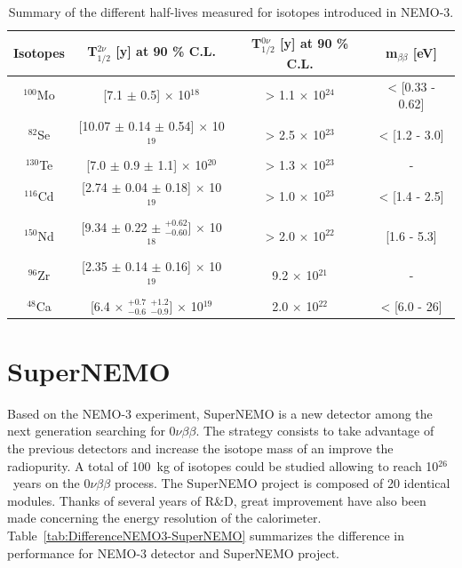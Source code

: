 \documentclass[main.tex]{subfiles}
\begin{document}
\begin{table}[h!]
\centering
\begin{tabular}{c|c|c|c}
Isotopes & T$_{\text{1/2}}^{\text{2}\nu}$ [y] at 90 \% C.L. & T$_{\text{1/2}}^{\text{0}\nu}$ [y] at 90 \% C.L. & m$_{\beta\beta}$ [eV] \\
\toprule
$^{\text{100}}$Mo \cite{NEMO3:Mo100} & [7.1 $\pm$ 0.5] $\times$ 10$^{\text{18}}$ & > 1.1 $\times$ 10$^{\text{24}}$ & < [0.33 - 0.62]  \\[0.1cm]
$^{\text{82}}$Se \cite{NEMO3:Se82} & [10.07 $\pm$ 0.14 $\pm$ 0.54] $\times$ 10$^{\text{19}}$ & > 2.5 $\times$ 10$^{\text{23}}$  & < [1.2 - 3.0]  \\[0.1cm]
$^{\text{130}}$Te \cite{NEMO3:Te130}& [7.0 $\pm$ 0.9 $\pm$ 1.1] $\times$ 10$^{\text{20}}$ & > 1.3 $\times$ 10$^{\text{23}}$  & - \\[0.1cm]
$^{\text{116}}$Cd \cite{Arnold2016bed}& [2.74 $\pm$ 0.04 $\pm$ 0.18] $\times$ 10$^{\text{19}}$ & > 1.0 $\times$ 10$^{\text{23}}$  & < [1.4 - 2.5]  \\[0.1cm]
$^{\text{150}}$Nd \cite{NEMO3:Nd150}& [9.34 $\pm$ 0.22 $\pm$ $^{+\text{0.62}}_{-\text{0.60}}$] $\times$ 10$^{\text{18}}$ & > 2.0 $\times$ 10$^{\text{22}}$  & [1.6 - 5.3] \\[0.1cm]
$^{\text{96}}$Zr  \cite{NEMO3:Zr96}& [2.35 $\pm$ 0.14 $\pm$ 0.16] $\times$ 10$^{\text{19}}$ & 9.2 $\times$ 10$^{\text{21}}$  & - \\[0.1cm]
$^{\text{48}}$Ca \cite{NEMO3:Ca48} & [6.4 $\times$ $^{+\text{0.7}}_{-\text{0.6}}$ $^{+\text{1.2}}_{-\text{0.9}}$] $\times$ 10$^{\text{19}}$ & 2.0 $\times$ 10$^{\text{22}}$  & < [6.0 - 26] \\[0.1cm]
\bottomrule
\end{tabular}
\caption{Summary of the different half-lives measured for isotopes introduced in NEMO-3.}
\label{tab:SummaryDecayRateNEMO3}
\end{table}


\FloatBarrier


\section{SuperNEMO}\label{sec:SuperNEMO}


\NI Based on the NEMO-3 experiment, SuperNEMO is a new detector among the next generation searching for 0$\nu\beta\beta$. The strategy consists to take advantage of the previous detectors and increase the isotope mass of an improve the radiopurity. A total of 100~kg of isotopes could be studied allowing to reach 10$^{\text{26}}$~years on the 0$\nu\beta\beta$ process. The SuperNEMO project is composed of 20 identical modules. Thanks of several years of R\&D, great improvement have also been made concerning the energy resolution of the calorimeter. Table~\ref{tab:DifferenceNEMO3-SuperNEMO} summarizes the difference in performance for NEMO-3 detector and SuperNEMO project.
\end{document}
